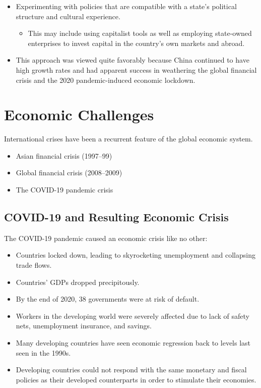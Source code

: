 \documentclass[
]{book}
\providecommand{\tightlist}{%
  \setlength{\itemsep}{0pt}\setlength{\parskip}{0pt}}
\begin{document}
\begin{itemize}
\tightlist
\item
  Experimenting with policies that are compatible with a state's political structure and cultural experience.

  \begin{itemize}
  \tightlist
  \item
    This may include using capitalist tools as well as employing state-owned enterprises to invest capital in the country's own markets and abroad.
  \end{itemize}
\item
  This approach was viewed quite favorably because China continued to have high growth rates and had apparent success in weathering the global financial crisis and the 2020 pandemic-induced economic lockdown.
\end{itemize}

\hypertarget{economic-challenges}{%
\section{Economic Challenges}\label{economic-challenges}}

International crises have been a recurrent feature of the global economic system.

\begin{itemize}
\item
  Asian financial crisis (1997--99)
\item
  Global financial crisis (2008--2009)
\item
  The COVID-19 pandemic crisis
\end{itemize}

\hypertarget{covid-19-and-resulting-economic-crisis}{%
\subsection{COVID-19 and Resulting Economic Crisis}\label{covid-19-and-resulting-economic-crisis}}

The COVID-19 pandemic caused an economic crisis like no other:

\begin{itemize}
\item
  Countries locked down, leading to skyrocketing unemployment and collapsing trade flows.
\item
  Countries' GDPs dropped precipitously.
\item
  By the end of 2020, 38 governments were at risk of default.
\item
  Workers in the developing world were severely affected due to lack of safety nets, unemployment insurance, and savings.
\item
  Many developing countries have seen economic regression back to levels last seen in the 1990s.
\item
  Developing countries could not respond with the same monetary and fiscal policies as their developed counterparts in order to stimulate their economies.
\end{itemize}
\end{document}
